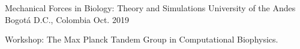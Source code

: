 \begin{cventries}
    
    \cventry
    {Mechanical Forces in Biology: Theory and Simulations} %
    {University of the Andes} %
    {Bogotá D.C., Colombia} %
    {Oct. 2019} %
    { %
    \begin{cvitems}
    \item {Workshop: The Max Planck Tandem Group in Computational Biophysics.}
    \end{cvitems}
    }
    
    
    \end{cventries}
    